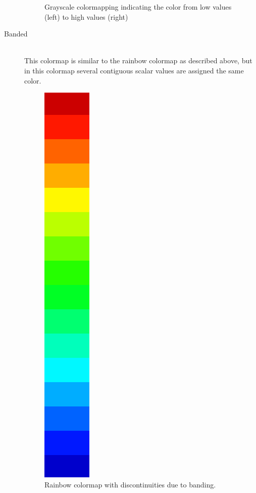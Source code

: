 \begin{description}
\begin{figure}[htb]
			  \caption{Grayscale colormapping indicating the color from low values (left) to high values (right)}
			\end{figure}
			\item[Banded] ~\\
			 This colormap is similar to the rainbow colormap as described above, but in this colormap several contiguous scalar values are assigned the same color. 
			\begin{figure}[htb]
			  \centering
			  \includegraphics[angle=270, width=\linewidth, totalheight=1em, frame]{./content/pictures/rainbow_16.png}
			  \caption{Rainbow colormap with discontinuities due to banding.}
			\end{figure}
		\end{description}
